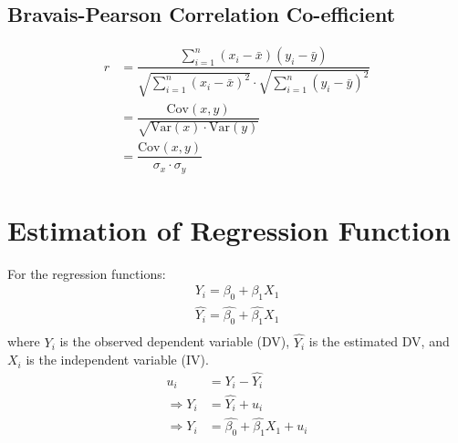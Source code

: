 \documentclass[openany,b5paper]{article}
\begin{document}
\subsection{Bravais-Pearson Correlation Co-efficient}
\begin{align}
r &= \dfrac{\sum_{i=1}^n (x_i-\bar{x})(y_i-\bar{y})}{\sqrt{\sum_{i=1}^n (x_i-\bar{x})^2} \cdot \sqrt{\sum_{i=1}^n (y_i -\bar{y})^2}}\\
& = \dfrac{\text{Cov}(x,y)}{\sqrt{\text{Var}(x) \cdot \text{Var}(y)}}\\
& = \dfrac{\text{Cov}(x,y)}{\sigma_x \cdot \sigma_y}
\end{align}

\section{Estimation of Regression Function}
For the regression functions:
\begin{align}
	Y_i = \beta_0 + \beta_1 X_1\\
	\hat{Y_i} = \hat{\beta_0} + \hat{\beta_1} X_1\\
\end{align}
where $Y_i$ is the observed dependent variable (DV), $\hat{Y_i}$ is the estimated DV, and $X_i$ is the independent variable (IV).
\begin{align}
	u_i &= Y_i - \hat{Y_i}\\
	\Rightarrow Y_i &= \hat{Y_i} + u_i\\
	\Rightarrow Y_i &= \hat{\beta_0} + \hat{\beta_1} X_1 + u_i
\end{align}
\end{document}
